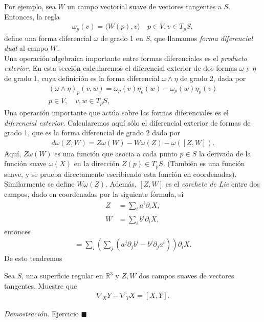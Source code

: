 \documentclass[oneside,11pt]{memoir}
\begin{document}
Por ejemplo, sea $W$ un campo vectorial suave de vectores tangentes a $S$. Entonces, la regla
\begin{align*}
    \omega_p(v)=\langle W(p),v\rangle \quad p\in V, v\in T_pS,
\end{align*}
define una forma diferencial $\omega$ de grado 1 en $S$, que llamamos \textit{forma diferencial dual} al campo $W$.\\
Una operación algebraica importante entre formas diferenciales es el \textit{producto exterior}. En esta sección calcularemos el diferencial exterior de dos formas $\omega$ y $\eta$ de grado 1, cuya definición es la forma diferencial $\omega\land \eta$ de grado 2, dada por
\begin{align*}
    (\omega\land\eta)_p(v,w)=\omega_p(v)\eta_p(w)-\omega_p(w)\eta_p(v)\\ p\in V,\quad v,w\in T_pS,
\end{align*}
Una operación importante que actúa sobre las formas diferenciales es el \textit{diferencial exterior}. Calcularemos aquí sólo el diferencial exterior de formas de grado 1, que es la forma diferencial
de grado 2 dado por
\begin{align*}
    d\omega(Z,W)=Z\omega(W)-W\omega(Z)-\omega([Z,W]).
\end{align*}
Aquí, $Z\omega(W)$ es una función que asocia a cada punto $p\in S$ la derivada de la función suave $\omega(X)$ en la dirección $Z(p)\in T_pS$. (También es una función suave, y se prueba directamente escribiendo esta función en coordenadas). Similarmente se define $W\omega(Z)$. Además, $[Z,W]$ es el \textit{corchete de Lie} entre dos campos, dado en coordenadas por la siguiente fórmula, si 
\begin{align*}
    Z&=\sum_ia^i\partial_iX,\\
    W&=\sum_ib^i\partial_iX,
\end{align*}
entonces
\begin{align*}
    [Z,W]=\sum_i\left(\sum_j(a^j\partial_jb^i-b^j\partial_ja^i)\right)\partial_iX.
\end{align*}
De esto tendremos
\begin{proposition}
    Sea $S$, una superficie regular en $\mathbb{R}^3$ y $Z,W$ dos campos suaves de vectores tangentes. Muestre que
    \begin{align*}
        \nabla_XY-\nabla_YX=[X,Y].
    \end{align*}
\end{proposition}
\textit{Demostración.}  Ejercicio
\hfill$\blacksquare$\\
\end{document}
